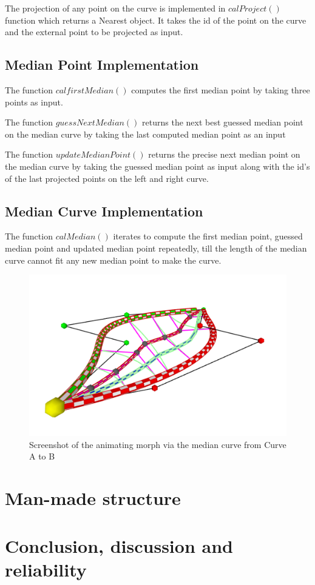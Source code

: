 \documentclass[twoside,11pt]{article}
\begin{document}
The projection of any point on the curve is implemented in $calProject()$ function which returns a Nearest object. It takes the id of the point on the curve and the external point to be projected as input.

\subsection{Median Point Implementation}
The function $calfirstMedian()$ computes the first median point by taking three points as input.

The function $guessNextMedian()$ returns the next best guessed median point on the median curve by taking the last computed median point as an input

The function $updateMedianPoint()$ returns the precise next median point on the median curve by taking the guessed median point as input along with the id's of the last projected points on the left and right curve.


\subsection{Median Curve Implementation}

The function $calMedian()$ iterates to compute the first median point, guessed median point and updated median point repeatedly, till the length of the median curve cannot fit any new median point to make the curve.




\begin{figure} [t]
    \centering
    \includegraphics[width=06in]{ssAnim.png}
    \caption{Screenshot of the animating morph via the median curve from Curve A to B}
\end{figure}














\section{Man-made structure}

\section{Conclusion, discussion and reliability}
\end{document}
